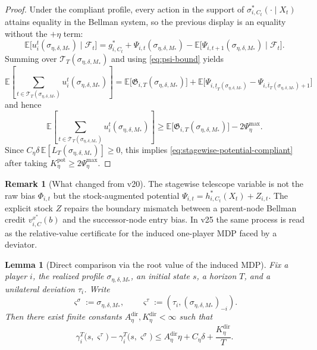 \documentclass[12pt]{article}
\newtheorem{lemma}[theorem]{Lemma}
\theoremstyle{definition}
\newtheorem{remark}[theorem]{Remark}
\newcommand{\E}{\mathbb{E}}
\newcommand{\1}{\mathbf{1}}
\newcommand{\cF}{\mathcal{F}}
\begin{document}
\begin{proof}
Under the compliant profile, every action in the support of
$\sigma_{i,C_t}^*(\cdot\mid X_t)$ attains equality in the Bellman system, so the
previous display is an equality without the $+\eta$ term:
\[
\E\bigl[u_i^t(\sigma_{\eta,\delta,M_*})\mid \cF_t\bigr]
=
g_{i,C_t}^*
+
\Psi_{i,t}(\sigma_{\eta,\delta,M_*})
-
\E\bigl[\Psi_{i,t+1}(\sigma_{\eta,\delta,M_*})\mid \cF_t\bigr].
\]
Summing over $\mathcal T_T(\sigma_{\eta,\delta,M_*})$ and using
\eqref{eq:psi-bound} yields
\[
\E\left[
\sum_{t\in\mathcal T_T(\sigma_{\eta,\delta,M_*})}
u_i^t(\sigma_{\eta,\delta,M_*})
\right]
=
\E\bigl[\mathfrak G_{i,T}(\sigma_{\eta,\delta,M_*})\bigr]
+
\E\bigl[
\Psi_{i,\underline t_T(\sigma_{\eta,\delta,M_*})}
-
\Psi_{i,\overline t_T(\sigma_{\eta,\delta,M_*})+1}
\bigr]
\]
and hence
\[
\E\left[
\sum_{t\in\mathcal T_T(\sigma_{\eta,\delta,M_*})}
u_i^t(\sigma_{\eta,\delta,M_*})
\right]
\ge
\E\bigl[\mathfrak G_{i,T}(\sigma_{\eta,\delta,M_*})\bigr]
-
2\Psi_\eta^{\max}.
\]
Since $C_\eta\delta\,\E[L_T(\sigma_{\eta,\delta,M_*})]\ge 0$, this implies
\eqref{eq:stagewise-potential-compliant} after taking
$K_\eta^{\mathrm{pot}}\ge 2\Psi_\eta^{\max}$.
\end{proof}

\begin{remark}[What changed from v20]
The stagewise telescope variable is not the raw bias $\Phi_{i,t}$ but the
stock-augmented potential $\Psi_{i,t}=h_{i,C_t}^*(X_t)+Z_{i,t}$. The explicit
stock $Z$ repairs the boundary mismatch between a parent-node Bellman credit
$v_{i,C}^{x^*}(b)$ and the successor-node entry bias. In v25 the same process is
read as the relative-value certificate for the induced one-player MDP faced by a
deviator.
\end{remark}

\begin{lemma}[Direct comparison via the root value of the induced MDP]
\label{lem:direct-tail-comparison}
Fix a player $i$, the realized profile $\sigma_{\eta,\delta,M_*}$, an initial
state $s$, a horizon $T$, and a unilateral deviation $\tau_i$. Write
\[
\varsigma^\sigma:=\sigma_{\eta,\delta,M_*},
\qquad
\varsigma^\tau:=(\tau_i,(\sigma_{\eta,\delta,M_*})_{-i}).
\]
Then there exist finite constants
$A_\eta^{\mathrm{dir}},K_\eta^{\mathrm{dir}}<\infty$ such that
\begin{equation}
\label{eq:direct-tail-comparison}
\gamma_i^T\bigl(s,\varsigma^\tau\bigr)
-
\gamma_i^T\bigl(s,\varsigma^\sigma\bigr)
\le
A_\eta^{\mathrm{dir}}\eta + C_\eta\delta + \frac{K_\eta^{\mathrm{dir}}}{T}.
\end{equation}
\end{lemma}
\end{document}
